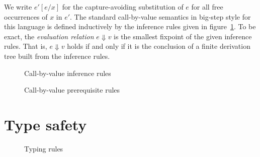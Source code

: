 \documentclass[12pt,a2paper,draft]{article}
\newcommand{\abstr}[2]{\ensuremath{\lambda{#1}.\,{#2}}}
\newcommand{\app}[2]{\ensuremath{{#1}\,{#2}}}
\renewcommand{\int}{\ensuremath{\textbf{int}}}
\newcommand{\rec}[2]{\ensuremath{\textbf{rec}\,{#1}.\,{#2}}}
\newcommand{\tj}[2]{\mbox{\ensuremath{{#1}:{#2}}}}
\newcommand{\Tj}[3]{\mbox{\ensuremath{{#1}\vdash\tj{#2}{#3}}}}
\begin{document}
We write $e'[e/x]$ for the capture-avoiding substitution of $e$ for all free occurrences
of $x$ in $e'$. The standard call-by-value semantics in big-step style for this language is
defined inductively by the inference rules given in figure~\ref{figure:Call_by_value_inference_rules}.
To be exact, the \emph{evaluation relation} $e \Downarrow v$ is the smallest fixpoint of
the given inference rules. That is, $e \Downarrow v$ holds if and only if it is the conclusion
of a finite derivation tree built from the inference rules.

\begin{figure}[htb]
  \centering
  \caption{Call-by-value inference rules}
  \label{figure:Call_by_value_inference_rules}
\end{figure}

\begin{figure}[htb]
  \centering
  \caption{Call-by-value prerequisite rules}
  \label{figure:Call_by_value_prerequisite_rules}
\end{figure}


\section{Type safety}

\begin{figure}[htb]
  \centering
  \caption{Typing rules}
  \label{figure:Typing_rules}
\end{figure}
\end{document}
